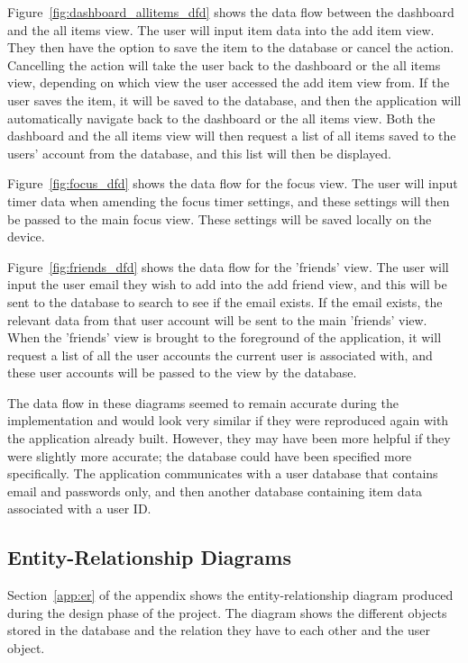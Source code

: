         Figure~\ref{fig:dashboard_allitems_dfd} shows the data flow between the dashboard and the all items view. The user will input item data into the add item view.  They then have the option to save the item to the database or cancel the action.  Cancelling the action will take the user back to the dashboard or the all items view, depending on which view the user accessed the add item view from. If the user saves the item, it will be saved to the database, and then the application will automatically navigate back to the dashboard or the all items view.  Both the dashboard and the all items view will then request a list of all items saved to the users' account from the database, and this list will then be displayed.
        
        Figure~\ref{fig:focus_dfd} shows the data flow for the focus view.  The user will input timer data when amending the focus timer settings, and these settings will then be passed to the main focus view.  These settings will be saved locally on the device.
        
        Figure~\ref{fig:friends_dfd} shows the data flow for the 'friends' view.  The user will input the user email they wish to add into the add friend view, and this will be sent to the database to search to see if the email exists.  If the email exists, the relevant data from that user account will be sent to the main 'friends' view.  When the 'friends' view is brought to the foreground of the application, it will request a list of all the user accounts the current user is associated with, and these user accounts will be passed to the view by the database.
        
        The data flow in these diagrams seemed to remain accurate during the implementation and would look very similar if they were reproduced again with the application already built.  However, they may have been more helpful if they were slightly more accurate; the database could have been specified more specifically. The application communicates with a user database that contains email and passwords only, and then another database containing item data associated with a user ID.
        
        \subsection{Entity-Relationship Diagrams}
        \label{subsec:E-R_diagram}
        Section~\ref{app:er} of the appendix shows the entity-relationship diagram produced during the design phase of the project.  The diagram shows the different objects stored in the database and the relation they have to each other and the user object.
        
